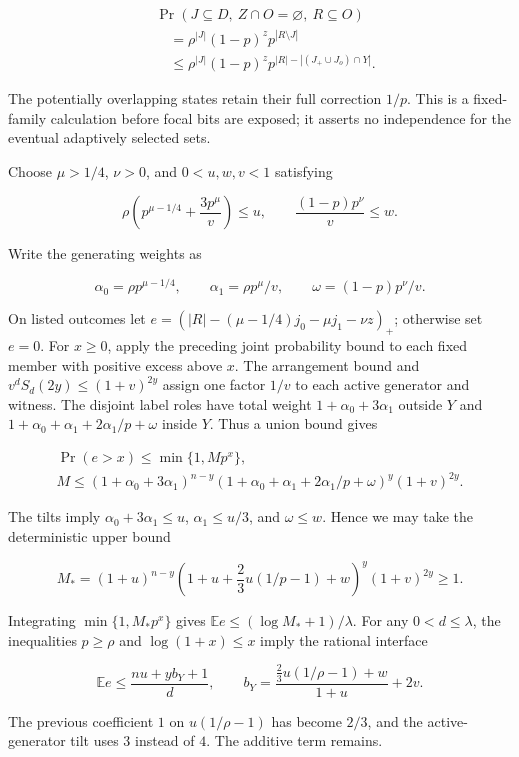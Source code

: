\documentclass[11pt]{article}
\begin{document}
\[\begin{aligned}
&\Pr(J\subseteq D,\ Z\cap O=\varnothing,\ R\subseteq O)\\
&\quad=\rho^{|J|}(1-p)^z p^{|R\setminus J|}\\
&\quad\le\rho^{|J|}(1-p)^z p^{|R|-|(J_+\cup J_o)\cap Y|}.
\end{aligned}\]

The potentially overlapping states retain their full correction \(1/p\). This is a fixed-family calculation before focal bits are exposed; it asserts no independence for the eventual adaptively selected sets.

Choose \(\mu>1/4\), \(\nu>0\), and \(0<u,w,v<1\) satisfying

\[\rho\left(p^{\mu-1/4}+\frac{3p^\mu}{v}\right)\le u,
\qquad \frac{(1-p)p^\nu}{v}\le w.\]

Write the generating weights as

\[\alpha_0=\rho p^{\mu-1/4},\qquad
\alpha_1=\rho p^\mu/v,\qquad \omega=(1-p)p^\nu/v.\]

On listed outcomes let \(e=(|R|-(\mu-1/4)j_0-\mu j_1-\nu z)_+\); otherwise set \(e=0\). For \(x\ge0\), apply the preceding joint probability bound to each fixed member with positive excess above \(x\). The arrangement bound and \(v^dS_d(2y)\le(1+v)^{2y}\) assign one factor \(1/v\) to each active generator and witness. The disjoint label roles have total weight \(1+\alpha_0+3\alpha_1\) outside \(Y\) and \(1+\alpha_0+\alpha_1+2\alpha_1/p+\omega\) inside \(Y\). Thus a union bound gives

\[\begin{gathered}
\Pr(e>x)\le\min\{1,Mp^x\},\\
M\le(1+\alpha_0+3\alpha_1)^{n-y}
(1+\alpha_0+\alpha_1+2\alpha_1/p+\omega)^y(1+v)^{2y}.
\end{gathered}\]

The tilts imply \(\alpha_0+3\alpha_1\le u\), \(\alpha_1\le u/3\), and \(\omega\le w\). Hence we may take the deterministic upper bound

\[M_*= (1+u)^{n-y}
\left(1+u+\frac23u(1/p-1)+w\right)^y(1+v)^{2y}\ge1.\]

Integrating \(\min\{1,M_*p^x\}\) gives \(\mathbb E e\le(\log M_*+1)/\lambda\). For any \(0<d\le\lambda\), the inequalities \(p\ge\rho\) and \(\log(1+x)\le x\) imply the rational interface

\[\mathbb E e\le\frac{n u+y b_Y+1}{d},\qquad
b_Y=\frac{\frac23u(1/\rho-1)+w}{1+u}+2v.\]

The previous coefficient \(1\) on \(u(1/\rho-1)\) has become \(2/3\), and the active-generator tilt uses \(3\) instead of \(4\). The additive term remains.
\end{document}
